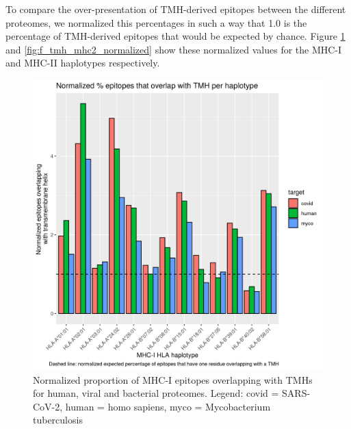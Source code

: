 To compare the over-presentation of TMH-derived epitopes between the
different proteomes, we normalized this percentages in such a
way that 1.0 is the percentage of TMH-derived epitopes that would 
be expected by chance. 
Figure \ref{fig:f_tmh_mhc1_normalized} and \ref{fig:f_tmh_mhc2_normalized}
show these normalized values for the MHC-I and MHC-II haplotypes respectively.

\begin{figure}[!htbp]
  \includegraphics[width=\textwidth]{bbbq_1_smart_results/fig_f_tmh_mhc1_2_normalized.png}
  \caption{
    Normalized proportion of MHC-I epitopes overlapping with TMHs
    for human, viral and bacterial proteomes.
    Legend: covid = SARS-CoV-2,
    human = homo sapiens, myco = Mycobacterium tuberculosis
  }
  \label{fig:f_tmh_mhc1_normalized}
\end{figure}

